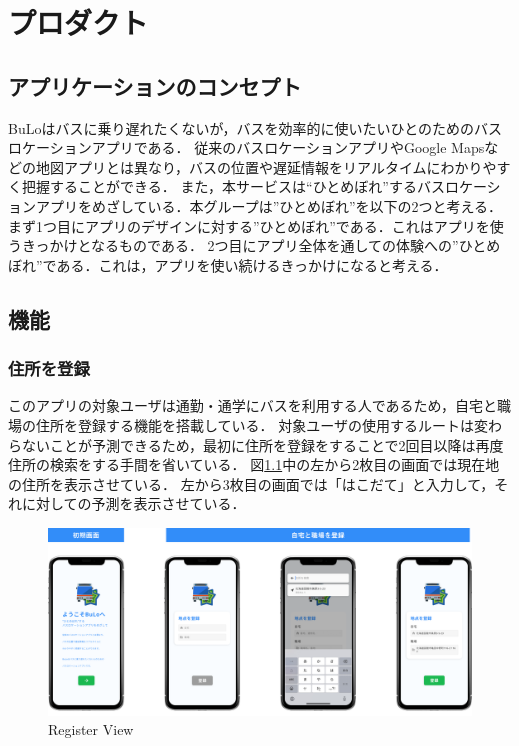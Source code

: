\chapter{プロダクト}

\section{アプリケーションのコンセプト}
BuLoはバスに乗り遅れたくないが，バスを効率的に使いたいひとのためのバスロケーションアプリである．
従来のバスロケーションアプリやGoogle Mapsなどの地図アプリとは異なり，バスの位置や遅延情報をリアルタイムにわかりやすく把握することができる．
また，本サービスは“ひとめぼれ”するバスロケーションアプリをめざしている．本グループは”ひとめぼれ”を以下の2つと考える．
まず1つ目にアプリのデザインに対する”ひとめぼれ”である．これはアプリを使うきっかけとなるものである．
2つ目にアプリ全体を通しての体験への”ひとめぼれ”である．これは，アプリを使い続けるきっかけになると考える．

\section{機能}
\subsection{住所を登録}
    このアプリの対象ユーザは通勤・通学にバスを利用する人であるため，自宅と職場の住所を登録する機能を搭載している．
    対象ユーザの使用するルートは変わらないことが予測できるため，最初に住所を登録をすることで2回目以降は再度住所の検索をする手間を省いている．
    図\ref{fig:feature_register}中の左から2枚目の画面では現在地の住所を表示させている．
    左から3枚目の画面では「はこだて」と入力して，それに対しての予測を表示させている．
    \begin{figure}
        \centering
        \includegraphics[width=14cm]{images/feature_register.png}
        \caption{Register View}
        \label{fig:feature_register}
    \end{figure}

